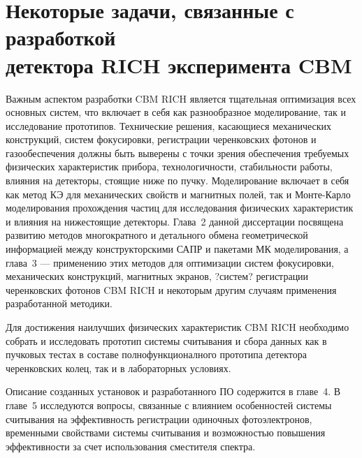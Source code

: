 \section[Некоторые задачи, связанные с разработкой детектора RICH эксперимента CBM]{Некоторые задачи, связанные с разработкой\\ детектора RICH эксперимента CBM}\label{sec:secCbmRichTasks}


Важным аспектом разработки CBM RICH является тщательная оптимизация всех основных систем, что включает в себя как разнообразное моделирование, так и исследование прототипов. Технические решения, касающиеся механических конструкций, систем фокусировки, регистрации черенковских фотонов и газообеспечения должны быть выверены с точки зрения обеспечения требуемых физических характеристик прибора, технологичности, стабильности работы, влияния на детекторы, стоящие ниже по пучку.
Моделирование включает в себя как метод КЭ для механических свойств и магнитных полей, так и Монте-Карло моделирования прохождения частиц для исследования физических характеристик и влияния на нижестоящие детекторы.
Глава~2 данной диссертации посвящена развитию методов многократного и детального обмена геометрической информацией между конструкторскими САПР и пакетами МК моделирования, а глава~3 --- применению этих методов для оптимизации систем фокусировки, механических конструкций, магнитных экранов, ?систем? регистрации черенковских фотонов CBM RICH и некоторым другим случаям применения разработанной методики.
% 

Для достижения наилучших физических характеристик CBM RICH необходимо собрать и исследовать прототип системы считывания и сбора данных как в пучковых тестах в составе полнофункционалного прототипа детектора черенковских колец, так и в лабораторных условиях.

Описание созданных установок и разработанного ПО содержится в главе~4.
В главе~5 исследуются вопросы, связанные с
влиянием особенностей системы считывания на эффективность регистрации одиночных фотоэлектронов,
временными свойствами системы считывания и
возможностью повышения эффективности за счет использования сместителя спектра.
